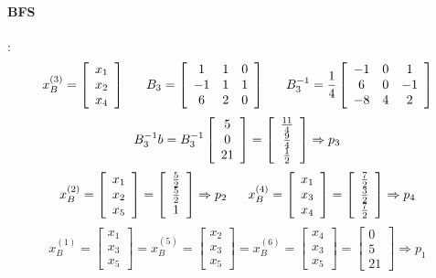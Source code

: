 \documentclass[12pt,a4paper]{article}
\begin{document}
\paragraph{BFS}:
$$x_B^{(3)} = \left[\begin{array}{c}x_1\\x_2\\x_4\end{array}\right] \ \ \ \ \ B_3=\left[\begin{array}{ccc}1&1&0\\-1&1&1\\6&2&0\end{array}\right] \ \ \ \ \ B_3^{-1}={1\over4}\left[\begin{array}{ccc}-1&0&1\\6&0&-1\\-8&4&2\end{array}\right]$$
$$B_3^{-1}b=B_3^{-1}\left[\begin{array}{c}5\\0\\21\end{array}\right] = \left[\begin{array}{c}{11\over4}\\{9\over4}\\{1\over2}\end{array}\right] \Rightarrow p_3$$
$$x_B^{(2)}=\left[\begin{array}{c}x_1\\x_2\\x_5\end{array}\right] = \left[\begin{array}{c}{5\over2}\\{5\over2}\\1\end{array}\right] \Rightarrow p_2 \ \ \ \ \ x_B^{(4)}=\left[\begin{array}{c}x_1\\x_3\\x_4\end{array}\right] = \left[\begin{array}{c}{7\over2}\\{3\over2}\\{7\over2}\end{array}\right] \Rightarrow p_4$$
$$x_B^{(1)}=\left[\begin{array}{c}x_1\\x_3\\x_5\end{array}\right] = x_B^{(5)}=\left[\begin{array}{c}x_2\\x_3\\x_5\end{array}\right] = x_B^{(6)}=\left[\begin{array}{c}x_4\\x_3\\x_5\end{array}\right]  = \left[\begin{array}{c}0\\5\\21\end{array}\right] \Rightarrow p_1$$
\end{document}
